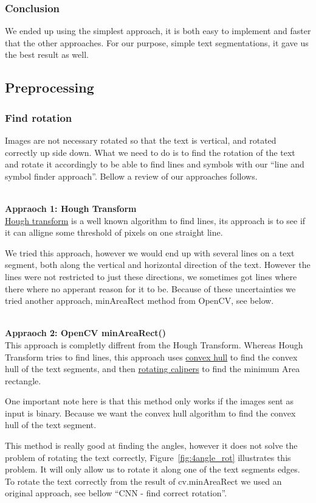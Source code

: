 \documentclass[11pt,a4paper,UKenglish]{article}
\begin{document}
\subsubsection{Conclusion}
We ended up using the simplest approach, it is both easy to implement and faster that the other approaches. For our purpose, simple text segmentations,  it gave us the best result as well. 


\subsection{Preprocessing}
\subsubsection{Find rotation}
Images are not necessary rotated so that the text is vertical, and rotated
correctly up side down. What we need to do is to find the rotation of the text
and rotate it accordingly to be able to find lines and symbols with our
``line and symbol finder approach''. Bellow a review of our approaches follows.

\noindent \\ \textbf{Appraoch 1: Hough Transform}
\noindent \\ \href{https://en.wikipedia.org/wiki/Hough_transform}{Hough transform} is a well known algorithm to find lines, its
approach is to see if it can alligne some threshold of pixels on one straight
line. \par
We tried this approach, however we would end up with several lines on a text
segment, both along the vertical and horizontal direction of the text. However
the lines were not restricted to just these directions, we sometimes got lines
where there where no apperant reason for it to be. Because of these
uncertainties we tried another approach, minAreaRect method from OpenCV, see
below.

\noindent \\ \textbf{Appraoch 2: OpenCV minAreaRect()}
\noindent \\ This approach is completly diffrent from the Hough Transform.
Whereas Hough Transform tries to find lines, this approach uses
\href{https://en.wikipedia.org/wiki/Convex_hull}{convex hull} to find the
convex hull of the text segments, and then
\href{https://en.wikipedia.org/wiki/Rotating_calipers}{rotating calipers} to
find the minimum Area rectangle. \par
One important note here is that this method only works if the images sent as
input is binary. Because we want the convex hull algorithm to find the convex
hull of the text segment. \par
This method is really good at finding the angles, however it does not solve the
problem of rotating the text correctly, Figure~\ref{fig:4angle_rot} illustrates
this problem. It will only allow us to rotate it along one of the text
segments edges. To rotate the text correctly from the result of cv.minAreaRect
we used an original approach, see bellow ``CNN - find correct rotation''.
\end{document}
